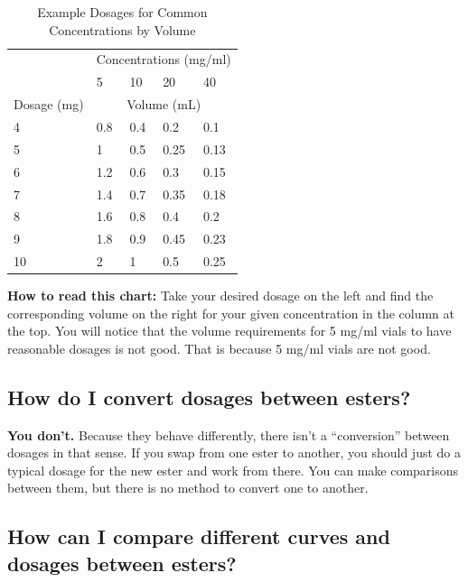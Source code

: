 \documentclass{article}
\begin{document}
\begin{table}[]
\centering
\caption{Example Dosages for Common Concentrations by Volume}
\label{tab:concentrations}
\begin{tabular}{@{}lllll@{}}
    \toprule
    \multicolumn{1}{c}{} & \multicolumn{4}{c}{Concentrations (mg/ml)} \\
    \cmidrule(rl){2-5}
            & 5    & 10  & 20 & 40    \\
            \cmidrule(rl){2-5}
Dosage (mg) & \multicolumn{4}{c}{Volume (mL)}  \\
    \cmidrule(r){1-1} \cmidrule(lr){2-5} 
4        & 0.8  & 0.4 & 0.2  & 0.1      \\
5        & 1    & 0.5 & 0.25 & 0.13   \\
6        & 1.2  & 0.6   & 0.3  & 0.15     \\
7        & 1.4  & 0.7 & 0.35  & 0.18  \\
8        & 1.6  & 0.8   & 0.4  & 0.2    \\
9        & 1.8  & 0.9 & 0.45  & 0.23 \\
10       & 2    & 1   & 0.5  & 0.25   \\
    \bottomrule
\end{tabular}
\end{table}

\textbf{How to read this chart:} Take your desired dosage on the left and find the corresponding volume on the right for your given concentration in the column at the top. You will notice that the volume requirements for 5 mg/ml vials to have reasonable dosages is not good. That is because 5 mg/ml vials are not good. 

\subsection{How do I convert dosages between esters?}

\textbf{You don’t. }Because they behave differently, there isn’t a “conversion” between dosages in that sense. If you swap from one ester to another, you should just do a typical dosage for the new ester and work from there. You can make comparisons between them, but there is no method to convert one to another.

\subsection{How can I compare different curves and dosages between esters?}
\end{document}
